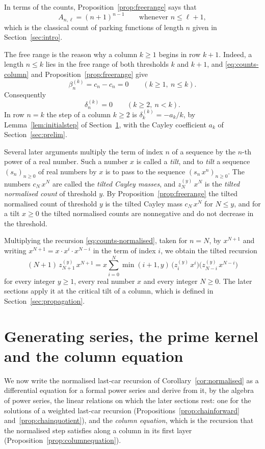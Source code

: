 \documentclass{amsart}
\makeatletter
\theoremstyle{definition}
\theoremstyle{remark}
\numberwithin{equation}{section}
\def\subsection{\@startsection{subsection}{2}\z@{.5\linespacing\@plus.7\linespacing}{-.5em}{\normalfont\bfseries\boldmath}}
\makeatother
\begin{document}
In terms of the counts,
Proposition~\ref{prop:freerange} says that
\[
A_{n,\ell}=(n+1)^{n-1}\qquad\text{whenever } n\le\ell+1,
\]
which is the classical count of parking functions of length $n$ given in
Section~\ref{sec:intro}.

The free range is the reason why a column $k\ge1$ begins in row $k+1$.
Indeed, a length $n\le k$ lies in the free range of both thresholds
$k$ and $k+1$, and \eqref{eq:counts-column} and
Proposition~\ref{prop:freerange} give
\[
\beta^{(k)}_n=c_n-c_n=0\qquad(k\ge1,\ n\le k).
\]
Consequently
\[
\delta^{(k)}_n=0\qquad(k\ge2,\ n<k).
\]
In row $n=k$ the step of a column $k\ge2$ is $\delta^{(k)}_k=-a_k/k$, by
Lemma~\ref{lem:initialstep} of Section~\ref{sec:series}, with the Cayley
coefficient $a_k$ of Section~\ref{sec:prelim}.

\subsection{The tilted recursion}\label{subsec:counts-tilts}

Several later arguments multiply the term of index $n$ of a sequence by the
$n$-th power of a real number. Such a number $x$ is called a \emph{tilt},
and to \emph{tilt} a sequence $(s_n)_{n\ge0}$ of real numbers by $x$ is to
pass to the sequence $(s_n\,x^n)_{n\ge0}$. The numbers $c_N\,x^N$ are called
the \emph{tilted Cayley masses}, and $z^{(y)}_N\,x^N$ is the \emph{tilted
normalised count} of threshold $y$. By Proposition~\ref{prop:freerange} the
tilted normalised count of threshold $y$ is the tilted Cayley mass
$c_N\,x^N$ for $N\le y$, and for a tilt $x\ge0$ the tilted normalised counts
are nonnegative and do not decrease in the threshold.

Multiplying the recursion \eqref{eq:counts-normalised}, taken for $n=N$, by
$x^{N+1}$ and writing $x^{N+1}=x\cdot x^{i}\cdot x^{N-i}$ in the term of
index $i$, we obtain the tilted recursion
\begin{equation}\label{eq:counts-tilted}
(N+1)\,z^{(y)}_{N+1}\,x^{N+1}
=x\sum_{i=0}^{N}\min(i+1,y)\,\bigl(z^{(y)}_i\,x^i\bigr)
\bigl(z^{(y)}_{N-i}\,x^{N-i}\bigr)
\end{equation}
for every integer $y\ge1$, every real number $x$ and every integer $N\ge0$.
The later sections apply it at the critical tilt of a column, which is
defined in Section~\ref{sec:propagation}.

\section{Generating series, the prime kernel and the column equation}\label{sec:series}
We now write the normalised last-car recursion of
Corollary~\ref{cor:normalised} as a differential equation for a formal power
series and derive from it, by the algebra of power series, the linear
relations on which the later sections rest: one for the solutions of a
weighted last-car recursion (Propositions~\ref{prop:chainforward}
and~\ref{prop:chainquotient}), and the \emph{column equation}, which is the
recursion that the normalised step satisfies along a column in its first
layer (Proposition~\ref{prop:columnequation}).
\end{document}
